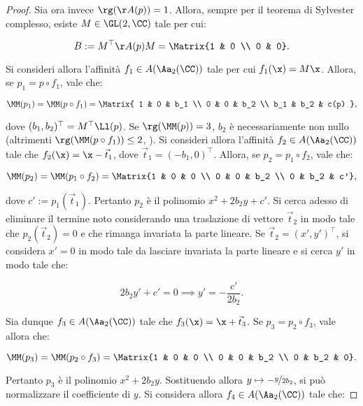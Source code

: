 \documentclass[11pt]{article}
\begin{document}
\begin{proof}
		Sia ora invece $\rg(\AA(p)) = 1$. Allora, sempre per
		il teorema di Sylvester complesso, esiste $M \in \GL(2, \CC)$
		tale per cui:
		
		\[ B := M^\top \AA(p) M = \Matrix{1 & 0 \\ 0 & 0}. \]
		
		\vskip 0.05in
		
		Si consideri allora l'affinità $f_1 \in A(\Aa_2(\CC))$ tale
		per cui $f_1(\x) = M \x$. Allora, se $p_1 = p \circ f_1$, vale che:
		
		\[ \MM(p_1) = \MM(p \circ f_1) = \Matrix{ 1 & 0 & b_1 \\ 0 & 0 & b_2 \\ b_1 & b_2 & c(p) }, \]
		
		\vskip 0.05in
		
		dove $(b_1, b_2)^\top = M^\top \Ll(p)$. Se $\rg(\MM(p)) = 3$, $b_2$ è necessariamente non nullo (altrimenti
		$\rg(\MM(p \circ f_1)) \leq 2$, \Lightning). Si consideri
		allora l'affinità $f_2 \in A(\Aa_2(\CC))$ tale che
		$f_2(\x) = \x - \vec t_1$, dove $\vec t_1 = (-b_1, 0)^\top$.
		Allora, se $p_2 = p_1 \circ f_2$, vale che:
		
		\[ \MM(p_2) = \MM(p_1 \circ f_2) = \Matrix{1 & 0 & 0 \\ 0 & 0 & b_2 \\ 0 & b_2 & c'}, \]
		
		\vskip 0.05in
		
		dove $c' := p_1(\vec t_1)$. Pertanto $p_2$ è il polinomio
		$x^2 + 2b_2 y + c'$. Si cerca adesso di eliminare il termine
		noto considerando una traslazione di vettore $\vec t_2$ in
		modo tale che $p_2(\vec t_2) = 0$ e che rimanga invariata
		la parte lineare. Se $\vec t_2 = (x', y')^\top$, si considera
		$x' = 0$ in modo tale da lasciare invariata la parte lineare
		e si cerca $y'$ in modo tale che:
		
		\[ 2b_2 y' + c' = 0 \implies y' = -\frac{c'}{2 b_2}. \]
		
		\vskip 0.05in
		
		Sia dunque $f_3 \in A(\Aa_2(\CC))$ tale che $f_3(\x) = \x + \vec t_3$. Se $p_3 = p_2 \circ f_3$, vale allora che:
		
		\[ \MM(p_3) = \MM(p_2 \circ f_3) = \Matrix{1 & 0 & 0 \\ 0 & 0 & b_2 \\ 0 & b_2 & 0}. \]
		
		\vskip 0.05in
		
		Pertanto $p_3$ è il polinomio $x^2 + 2b_2 y$. Sostituendo
		allora $y \mapsto -\nicefrac{y}{2b_2}$, si può normalizzare il
		coefficiente di $y$. Si considera allora $f_4 \in A(\Aa_2(\CC))$ tale che:
		

\end{proof}
\end{document}
